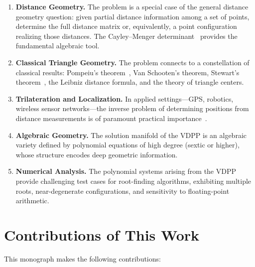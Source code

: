 \begin{enumerate}[label=(\roman*)]
    \item \textbf{Distance Geometry.} The problem is a special case of the general distance geometry question: given partial distance information among a set of points, determine the full distance matrix or, equivalently, a point configuration realizing those distances. The Cayley--Menger determinant~\citep{cayley1841,menger1928,blumenthal1953} provides the fundamental algebraic tool.

    \item \textbf{Classical Triangle Geometry.} The problem connects to a constellation of classical results: Pompeiu's theorem~\citep{pompeiu1936}, Van Schooten's theorem, Stewart's theorem~\citep{stewart1746}, the Leibniz distance formula, and the theory of triangle centers.

    \item \textbf{Trilateration and Localization.} In applied settings---GPS, robotics, wireless sensor networks---the inverse problem of determining positions from distance measurements is of paramount practical importance~\citep{thomas2005revisiting}.

    \item \textbf{Algebraic Geometry.} The solution manifold of the VDPP is an algebraic variety defined by polynomial equations of high degree (sextic or higher), whose structure encodes deep geometric information.

    \item \textbf{Numerical Analysis.} The polynomial systems arising from the VDPP provide challenging test cases for root-finding algorithms, exhibiting multiple roots, near-degenerate configurations, and sensitivity to floating-point arithmetic.
\end{enumerate}

\section{Contributions of This Work}

This monograph makes the following contributions:

